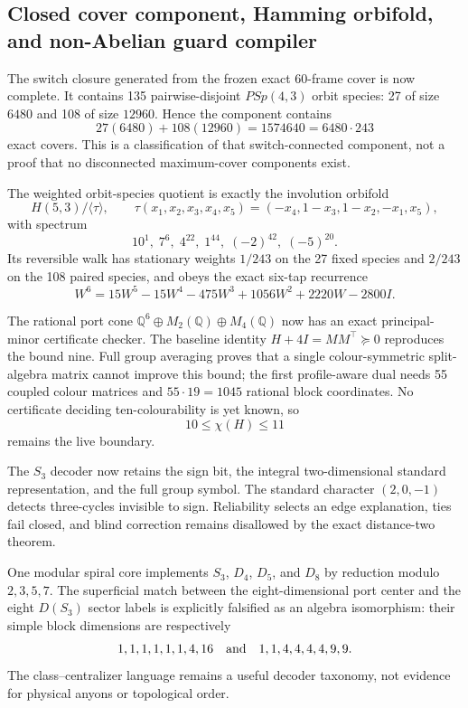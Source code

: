 \subsection{Closed cover component, Hamming orbifold, and non-Abelian guard compiler}
The switch closure generated from the frozen exact 60-frame cover is now complete.  It contains 135 pairwise-disjoint $PSp(4,3)$ orbit species: 27 of size $6480$ and 108 of size $12960$.  Hence the component contains
\[
27(6480)+108(12960)=1574640=6480\cdot243
\]
exact covers.  This is a classification of that switch-connected component, not a proof that no disconnected maximum-cover components exist.

The weighted orbit-species quotient is exactly the involution orbifold
\[
H(5,3)/\langle\tau\rangle,
\qquad
\tau(x_1,x_2,x_3,x_4,x_5)=(-x_4,1-x_3,1-x_2,-x_1,x_5),
\]
with spectrum
\[
10^1,\;7^6,\;4^{22},\;1^{44},\;(-2)^{42},\;(-5)^{20}.
\]
Its reversible walk has stationary weights $1/243$ on the 27 fixed species and $2/243$ on the 108 paired species, and obeys the exact six-tap recurrence
\[
W^6=15W^5-15W^4-475W^3+1056W^2+2220W-2800I.
\]

The rational port cone $\mathbb Q^6\oplus M_2(\mathbb Q)\oplus M_4(\mathbb Q)$ now has an exact principal-minor certificate checker.  The baseline identity $H+4I=MM^\top\succeq0$ reproduces the bound nine.  Full group averaging proves that a single colour-symmetric split-algebra matrix cannot improve this bound; the first profile-aware dual needs 55 coupled colour matrices and $55\cdot19=1045$ rational block coordinates.  No certificate deciding ten-colourability is yet known, so
\[
10\leq\chi(H)\leq11
\]
remains the live boundary.

The $S_3$ decoder now retains the sign bit, the integral two-dimensional standard representation, and the full group symbol.  The standard character $(2,0,-1)$ detects three-cycles invisible to sign.  Reliability selects an edge explanation, ties fail closed, and blind correction remains disallowed by the exact distance-two theorem.

One modular spiral core implements $S_3$, $D_4$, $D_5$, and $D_8$ by reduction modulo $2,3,5,7$.  The superficial match between the eight-dimensional port center and the eight $D(S_3)$ sector labels is explicitly falsified as an algebra isomorphism: their simple block dimensions are respectively
\[
1,1,1,1,1,1,4,16
\quad\hbox{and}\quad
1,1,4,4,4,4,9,9.
\]
The class--centralizer language remains a useful decoder taxonomy, not evidence for physical anyons or topological order.
